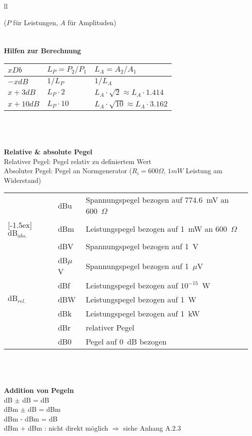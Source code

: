 \begin{tabular}{ll}
{\small{($P$ für Leistungen, $A$ für Amplituden)}
\\ \\ \\

\textbf{Hilfen zur Berechnung}\\
\begin{tabular}{|l|ll|}
\hline
$x Db$  & $L_P=P_2/P_1$ &$L_A=A_2/A_1$ \\
\hline
$-x dB$ & $1/L_P$   & $1/L_A$\\
$x+3dB$ & $L_P \cdot 2$ & $L_A \cdot \sqrt{2} \approx L_A \cdot 1.414$ \\
$x+10dB$    & $L_P \cdot 10$ & $L_A \cdot \sqrt{10} \approx L_A \cdot 3.162$\\
\hline
\end{tabular}
\\ \\ \\

\textbf{Relative \& absolute Pegel}\\
Relativer Pegel: Pegel relativ zu definiertem Wert\\
Absoluter Pegel: Pegel an Normgenerator ($R_i = 600 \Omega$, $1mW$ Leistung am
Widerstand)\\ 
\begin{tabular}{|l|l|l|}\hline
  & dBu & Spannungspegel bezogen auf 774.6~mV an 600~$\Omega$\\ \cline{2-3}
 \multicolumn{1}{|l|}{\raisebox{1.5ex}[-1.5ex]{$\mbox{dB}_{abs.}$}} & dBm & Leistungspegel bezogen auf 1~mW an 600~$\Omega$\\ \hline\hline
  & dBV & Spannungspegel bezogen auf 1~V\\ \cline{2-3}
  & dB$\mu$V & Spannungspegel bezogen auf 1~$\mu$V\\ \cline{2-3}
  & dBf & Leistungspegel bezogen auf $10^{-15}$~W\\ \cline{2-3} 
\multicolumn{1}{|l|}{$\mbox{dB}_{rel.}$}  & dBW & Leistungspegel bezogen auf 1~W\\ \cline{2-3}
  & dBk & Leistungspegel bezogen auf 1~kW\\ \cline{2-3}
  & dBr & relativer Pegel\\ \cline{2-3}
  & dB0 & Pegel auf 0~dB bezogen\\ \hline
\end{tabular}\\ \\ \\
\textbf{Addition von Pegeln} \\
dB $\pm$ dB = dB \\ 
dBm $\pm$ dB = dBm \\ 
dBm - dBm = dB \\
dBm + dBm : nicht direkt möglich $\Rightarrow$ siehe Anhang A.2.3
 }
\end{tabular}
